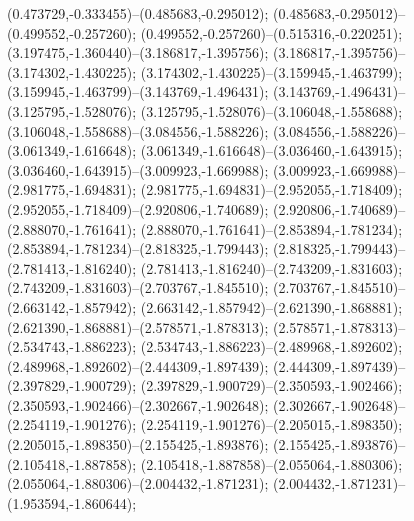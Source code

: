  (0.473729,-0.333455)--(0.485683,-0.295012);
 (0.485683,-0.295012)--(0.499552,-0.257260);
 (0.499552,-0.257260)--(0.515316,-0.220251);
 (3.197475,-1.360440)--(3.186817,-1.395756);
 (3.186817,-1.395756)--(3.174302,-1.430225);
 (3.174302,-1.430225)--(3.159945,-1.463799);
 (3.159945,-1.463799)--(3.143769,-1.496431);
 (3.143769,-1.496431)--(3.125795,-1.528076);
 (3.125795,-1.528076)--(3.106048,-1.558688);
 (3.106048,-1.558688)--(3.084556,-1.588226);
 (3.084556,-1.588226)--(3.061349,-1.616648);
 (3.061349,-1.616648)--(3.036460,-1.643915);
 (3.036460,-1.643915)--(3.009923,-1.669988);
 (3.009923,-1.669988)--(2.981775,-1.694831);
 (2.981775,-1.694831)--(2.952055,-1.718409);
 (2.952055,-1.718409)--(2.920806,-1.740689);
 (2.920806,-1.740689)--(2.888070,-1.761641);
 (2.888070,-1.761641)--(2.853894,-1.781234);
 (2.853894,-1.781234)--(2.818325,-1.799443);
 (2.818325,-1.799443)--(2.781413,-1.816240);
 (2.781413,-1.816240)--(2.743209,-1.831603);
 (2.743209,-1.831603)--(2.703767,-1.845510);
 (2.703767,-1.845510)--(2.663142,-1.857942);
 (2.663142,-1.857942)--(2.621390,-1.868881);
 (2.621390,-1.868881)--(2.578571,-1.878313);
 (2.578571,-1.878313)--(2.534743,-1.886223);
 (2.534743,-1.886223)--(2.489968,-1.892602);
 (2.489968,-1.892602)--(2.444309,-1.897439);
 (2.444309,-1.897439)--(2.397829,-1.900729);
 (2.397829,-1.900729)--(2.350593,-1.902466);
 (2.350593,-1.902466)--(2.302667,-1.902648);
 (2.302667,-1.902648)--(2.254119,-1.901276);
 (2.254119,-1.901276)--(2.205015,-1.898350);
 (2.205015,-1.898350)--(2.155425,-1.893876);
 (2.155425,-1.893876)--(2.105418,-1.887858);
 (2.105418,-1.887858)--(2.055064,-1.880306);
 (2.055064,-1.880306)--(2.004432,-1.871231);
 (2.004432,-1.871231)--(1.953594,-1.860644);
